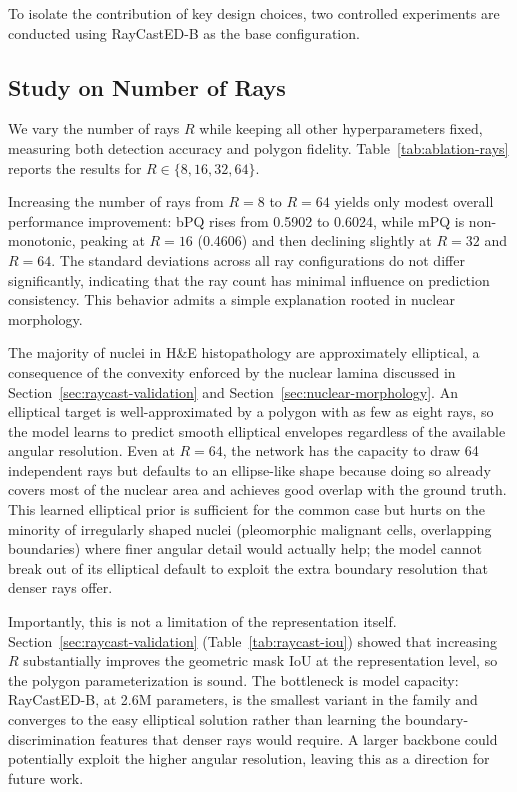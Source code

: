 To isolate the contribution of key design choices, two controlled experiments are conducted using
RayCastED-B as the base configuration.

\subsection{Study on Number of Rays}
\label{sec:ablation-rays}

We vary the number of rays $R$ while keeping all other hyperparameters fixed, measuring
both detection accuracy and polygon fidelity. Table~\ref{tab:ablation-rays} reports the
results for $R \in \{8, 16, 32, 64\}$.



Increasing the number of rays from $R=8$ to $R=64$ yields only modest overall performance improvement: bPQ rises from 0.5902 to 0.6024, while mPQ is non-monotonic, peaking at $R=16$ (0.4606) and then declining slightly at $R=32$ and $R=64$. The standard deviations across all ray configurations do not differ significantly, indicating that the ray count has minimal influence on prediction consistency. This behavior admits a simple explanation rooted in nuclear morphology.

The majority of nuclei in H\&E histopathology are approximately elliptical, a consequence of the convexity enforced by the nuclear lamina discussed in Section~\ref{sec:raycast-validation} and Section~\ref{sec:nuclear-morphology}. An elliptical target is well-approximated by a polygon with as few as eight rays, so the model learns to predict smooth elliptical envelopes regardless of the available angular resolution. Even at $R=64$, the network has the capacity to draw 64 independent rays but defaults to an ellipse-like shape because doing so already covers most of the nuclear area and achieves good overlap with the ground truth. This learned elliptical prior is sufficient for the common case but hurts on the minority of irregularly shaped nuclei (pleomorphic malignant cells, overlapping boundaries) where finer angular detail would actually help; the model cannot break out of its elliptical default to exploit the extra boundary resolution that denser rays offer.

Importantly, this is not a limitation of the representation itself. Section~\ref{sec:raycast-validation} (Table~\ref{tab:raycast-iou}) showed that increasing $R$ substantially improves the geometric mask IoU at the representation level, so the polygon parameterization is sound. The bottleneck is model capacity: RayCastED-B, at 2.6M parameters, is the smallest variant in the family and converges to the easy elliptical solution rather than learning the boundary-discrimination features that denser rays would require. A larger backbone could potentially exploit the higher angular resolution, leaving this as a direction for future work.

